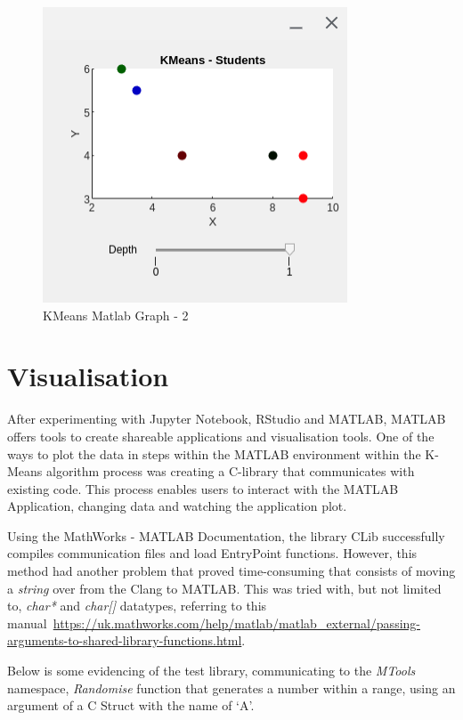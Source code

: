 \documentclass[conference]{IEEEtran}
\begin{document}
      \begin{figure}[ht]
        \centering
        \includegraphics[width=0.65\columnwidth]{Figures/fig5.png}
        \caption{KMeans Matlab Graph - 2}
        \label{fig:kmeansMatlabGraph-2}
      \end{figure}

    \section{Visualisation}
      After experimenting with Jupyter Notebook, RStudio and MATLAB, MATLAB offers tools to create shareable applications and visualisation tools. One of the ways to plot the data in steps within the MATLAB environment within the K-Means algorithm process was creating a C-library that communicates with existing code. This process enables users to interact with the MATLAB Application, changing data and watching the application plot. 
        
      Using the MathWorks - MATLAB Documentation, the library CLib successfully compiles communication files and load EntryPoint functions. However, this method had another problem that proved time-consuming that consists of moving a \textit{string} over from the Clang to MATLAB. This was tried with, but not limited to, \textit{char*} and \textit{char[]} datatypes, referring to this manual~\url{https://uk.mathworks.com/help/matlab/matlab_external/passing-arguments-to-shared-library-functions.html}. 

      Below is some evidencing of the test library, communicating to the \textit{MTools} namespace, \textit{Randomise} function that generates a number within a range, using an argument of a C Struct with the name of `A'.
      
\end{document}
